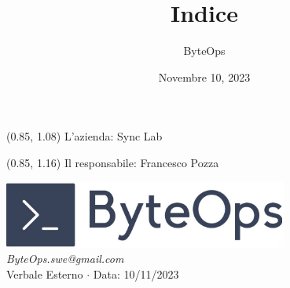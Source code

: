 \documentclass{article}
\title{\textbf{\fontsize{28}{6}\selectfont Indice}}
\author{\fontsize{14}{6}\selectfont ByteOps}
\date{Novembre 10, 2023}
\begin{document}

\begin{textblock*}{\textwidth}(0.85\textwidth, 1.08\textheight)
L'azienda: Sync Lab
\end{textblock*}

\begin{textblock*}{\textwidth}(0.85\textwidth, 1.16\textheight)
Il responsabile: Francesco Pozza
\end{textblock*}


\pagestyle{fancy}
\begin{center}
\includegraphics[width = 0.7\textwidth]{../../Images/logo.png} \\
\vspace{0.2cm}
\textcolor[RGB]{60, 60, 60}{\textit{ByteOps.swe@gmail.com}} \\
\vspace{1cm}
\fontsize{16}{6}\selectfont Verbale Esterno $\cdot$ Data: 10/11/2023 \\
\vspace{0.5cm}
\end{center}
\end{document}
